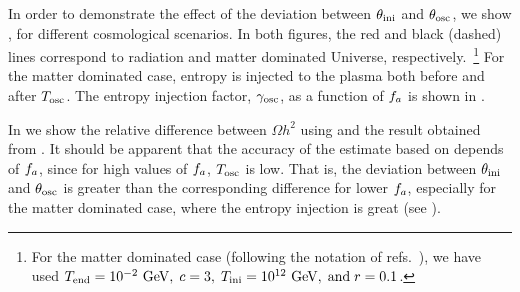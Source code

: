 \documentclass[11pt,a4paper]{article}
\begin{document}
In order to demonstrate the effect of the deviation between $\theta_{\rm ini}{}$ and $\theta_{\rm osc}{}$, we show , for different cosmological scenarios. In both figures, the red and black (dashed) lines correspond to radiation and matter dominated Universe, respectively.~\footnote{For the matter dominated case (following the notation of refs.~\cite{Arias:2019uol,Arias:2020qty}), we have used 
$T_{\rm end}=10^{-2} ~{\rm GeV},\; c=3, \; T_{\rm ini}=10^{12} ~{\rm GeV}, \; \text{and}\; r=0.1$.} For the matter dominated case, entropy is injected to the plasma both before and after $T_{\rm osc}{}$. The entropy injection factor, $\gamma_{\rm osc}$, as a function of $f_{a}{}$ is shown in .

In  we show the relative difference between $\Omega h^2$ using  and the result obtained from \mimes. It should be apparent that the accuracy of the estimate based on  depends of $f_{a}{}$, since for high values of $f_{a}{}$, $T_{\rm osc}{}$ is low. That is, the deviation between $\theta_{\rm ini}{}$ and $\theta_{\rm osc}{}$ is greater than the corresponding difference for lower $f_{a}{}$, especially for the matter dominated case, where the entropy injection is great (see ).
\end{document}
